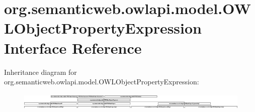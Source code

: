 \hypertarget{interfaceorg_1_1semanticweb_1_1owlapi_1_1model_1_1_o_w_l_object_property_expression}{\section{org.\-semanticweb.\-owlapi.\-model.\-O\-W\-L\-Object\-Property\-Expression Interface Reference}
\label{interfaceorg_1_1semanticweb_1_1owlapi_1_1model_1_1_o_w_l_object_property_expression}
}
Inheritance diagram for org.\-semanticweb.\-owlapi.\-model.\-O\-W\-L\-Object\-Property\-Expression\-:\begin{figure}[H]
\begin{center}
\leavevmode
\includegraphics[height=0.832095cm]{interfaceorg_1_1semanticweb_1_1owlapi_1_1model_1_1_o_w_l_object_property_expression}
\end{center}
\end{figure}
